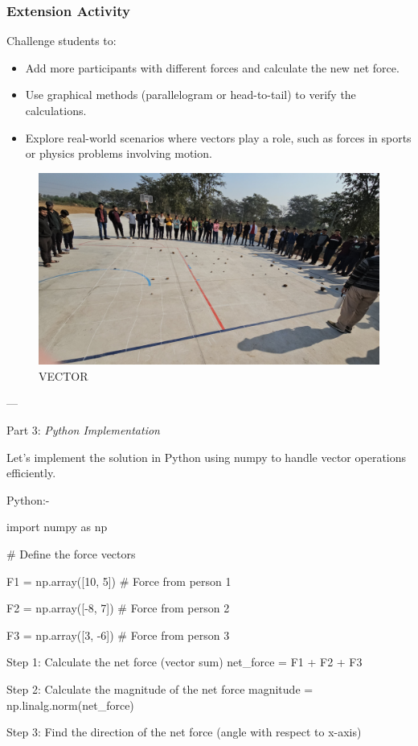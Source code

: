 \documentclass{report}
\begin{document}
\subsubsection*{Extension Activity}
Challenge students to:
\begin{itemize}
    \item Add more participants with different forces and calculate the new net force.
    \item Use graphical methods (parallelogram or head-to-tail) to verify the calculations.
    \item Explore real-world scenarios where vectors play a role, such as forces in sports or physics problems involving motion.
\end{itemize}

\begin{figure}
    \centering
    \includegraphics[width=0.7\linewidth]{VECTOR.jpg}
    \caption{VECTOR}
    \label{fig:VECTOR}
\end{figure}




---

Part 3: \textit{Python Implementation}


Let's implement the solution in Python using numpy to handle vector operations efficiently.

Python:-


import numpy as np


# Define the force vectors \ 

F1 = np.array([10, 5])  # Force from person 1 \ 

F2 = np.array([-8, 7])  # Force from person 2 \ 

F3 = np.array([3, -6])  # Force from person 3 \ 


Step 1: Calculate the net force (vector sum)
net_force = F1 + F2 + F3

Step 2: Calculate the magnitude of the net force
magnitude = np.linalg.norm(net_force)

Step 3: Find the direction of the net force (angle with respect to x-axis) \ 
\end{document}
